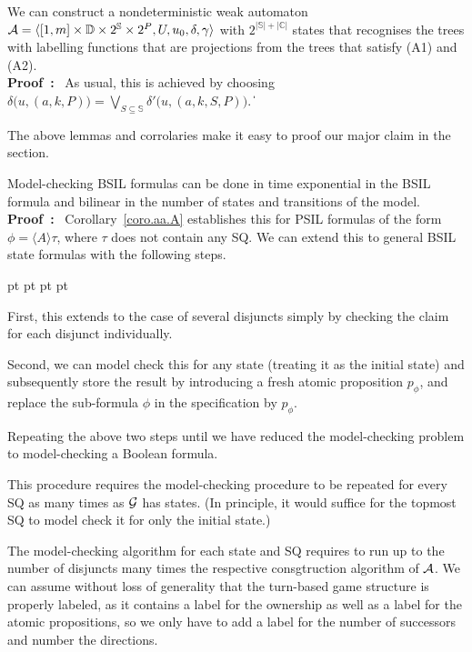\documentclass[11pt]{article}
\newcommand{\cala}{{\cal A}}
\newcommand{\calg}{{\cal G}}
\newcommand{\pf}{\noindent\mbox{\bf Proof : }}
\newcommand{\bbbbc}{{\mathbb C}}
\newcommand{\bbbbd}{{\mathbb D}}
\newcommand{\bbbbs}{{\mathbb S}}
\def\qed{\ifmmode\|\else{\unskip\nobreak\hfil
\penalty50\hskip1em\null\nobreak\hfil$\blacksquare$
\parfillskip=0pt\finalhyphendemerits=0\endgraf}\fi}
\newcounter{sequent1}
\newcounter{sequent2}
\newcounter{sequent3}
\newcounter{sequent4}
\newenvironment{stmt1}{\begin{list}{(\arabic{sequent1})}
  {\usecounter{sequent1}
    \topsep 0 pt \parsep 2 pt \partopsep 0 pt \itemsep 0 pt
} }{\end{list}}
\begin{document}
{\corollary\label{coro.aa.A}
We can construct a nondeterministic weak automaton 
$\cala=\langle [1,m] \times \bbbbd \times 2^\bbbbs \times 2^P,
U,u_0,\delta, \gamma \rangle$ 
with $2^{|\bbbbs|+|\bbbbc|}$ states that recognises 
the trees with labelling functions that are projections from 
the trees that satisfy (A1) and (A2).
}
\\\pf 
As usual, this is achieved by choosing 
$\delta\big(u,(a,k,P)\big) = 
\bigvee_{S \subseteq \bbbbs}\delta'\big(u,(a,k,S,P)\big)$.
\qed 

The above lemmas and corrolaries  
make it easy to proof our major claim in the section.  

{\theorem\label{thm.aa.main}
Model-checking BSIL formulas can be done in time exponential in the BSIL formula and bilinear in the number of states and transitions of the model.
}
\\\pf 
Corollary~\ref{coro.aa.A} 
establishes this for PSIL formulas of the form 
$\phi=\langle A \rangle \tau$, where $\tau$ does not contain any SQ.
We can extend this to general BSIL state formulas with the following 
steps. 
\begin{stmt1} 
\item First, this extends to the case of several disjuncts simply 
  by checking the claim for each disjunct individually.
\item Second, we can model check this for any state (treating it as the initial state) and subsequently store the result by introducing a fresh atomic proposition $p_\phi$, and replace the sub-formula $\phi$ in the specification by $p_\phi$.
\item Repeating the above two steps until we have reduced 
  the model-checking problem to model-checking a Boolean formula.
\end{stmt1} 
This procedure requires the model-checking procedure 
to be repeated for every SQ as many times as $\calg$ has states.
(In principle, it would suffice for the topmost SQ to model check it 
for only the initial state.)

The model-checking algorithm for each state and SQ requires 
to run up to the number of disjuncts many times the respective 
consgtruction algorithm of $\cala$.
We can assume without loss of generality that the turn-based game structure is properly labeled, as it contains a label for the ownership as well as a label for the atomic propositions, so we only have to add a label for the number of successors and number the directions.
\end{document}
